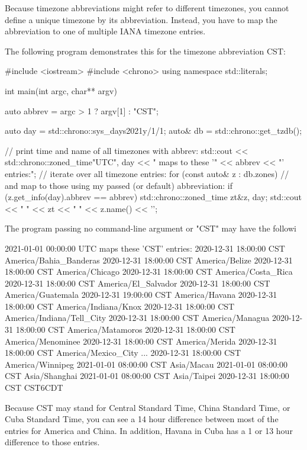 Because timezone abbreviations might refer to different timezones, you cannot define a unique timezone by its abbreviation. Instead, you have to map the abbreviation to one of multiple IANA timezone entries.

The following program demonstrates this for the timezone abbreviation CST:


\begin{cpp}
#include <iostream>
#include <chrono>
using namespace std::literals;

int main(int argc, char** argv)
{
	auto abbrev = argc > 1 ? argv[1] : "CST";
	
	auto day = std::chrono::sys_days{2021y/1/1};
	auto& db = std::chrono::get_tzdb();
	
	// print time and name of all timezones with abbrev:
	std::cout << std::chrono::zoned_time{"UTC", day}
			  << " maps to these '" << abbrev << "' entries:\n";
	// iterate over all timezone entries:
	for (const auto& z : db.zones) {
		// and map to those using my passed (or default) abbreviation:
		if (z.get_info(day).abbrev == abbrev) {
			std::chrono::zoned_time zt{&z, day};
			std::cout << " " << zt << " " << z.name() << '\n';
		}
	}
}
\end{cpp}

The program passing no command-line argument or "CST" may have the followi

\begin{shell}
2021-01-01 00:00:00 UTC maps these ’CST’ entries:
  2020-12-31 18:00:00 CST America/Bahia_Banderas
  2020-12-31 18:00:00 CST America/Belize
  2020-12-31 18:00:00 CST America/Chicago
  2020-12-31 18:00:00 CST America/Costa_Rica
  2020-12-31 18:00:00 CST America/El_Salvador
  2020-12-31 18:00:00 CST America/Guatemala
  2020-12-31 19:00:00 CST America/Havana
  2020-12-31 18:00:00 CST America/Indiana/Knox
  2020-12-31 18:00:00 CST America/Indiana/Tell_City
  2020-12-31 18:00:00 CST America/Managua
  2020-12-31 18:00:00 CST America/Matamoros
  2020-12-31 18:00:00 CST America/Menominee
  2020-12-31 18:00:00 CST America/Merida
  2020-12-31 18:00:00 CST America/Mexico_City
  ...
  2020-12-31 18:00:00 CST America/Winnipeg
  2021-01-01 08:00:00 CST Asia/Macau
  2021-01-01 08:00:00 CST Asia/Shanghai
  2021-01-01 08:00:00 CST Asia/Taipei
  2020-12-31 18:00:00 CST CST6CDT
\end{shell}

Because CST may stand for Central Standard Time, China Standard Time, or Cuba Standard Time, you can see a 14 hour difference between most of the entries for America and China. In addition, Havana in Cuba has a 1 or 13 hour difference to those entries.

